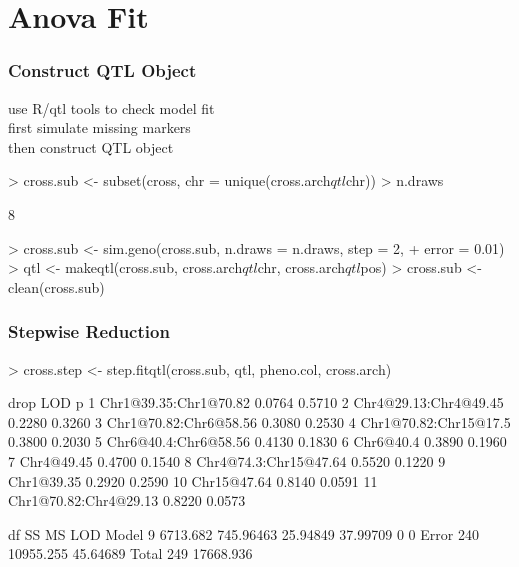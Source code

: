 \documentclass{beamer}
\begin{document}
\section{Anova Fit}

\begin{frame}[fragile]
  \frametitle{Construct QTL Object}

\tiny

use R/qtl tools to check model fit\\
first simulate missing markers\\
then construct QTL object

\begin{Schunk}
\begin{Sinput}
> cross.sub <- subset(cross, chr = unique(cross.arch$qtl$chr))
> n.draws
\end{Sinput}
\begin{Soutput}
[1] 8
\end{Soutput}
\begin{Sinput}
> cross.sub <- sim.geno(cross.sub, n.draws = n.draws, step = 2, 
+     error = 0.01)
> qtl <- makeqtl(cross.sub, cross.arch$qtl$chr, cross.arch$qtl$pos)
> cross.sub <- clean(cross.sub)
\end{Sinput}
\end{Schunk}
\end{frame}

\begin{frame}[fragile]
  \frametitle{Stepwise Reduction}

\tiny

\begin{Schunk}
\begin{Sinput}
> cross.step <- step.fitqtl(cross.sub, qtl, pheno.col, cross.arch)
\end{Sinput}
\begin{Soutput}
   drop                  LOD    p     
1  Chr1@39.35:Chr1@70.82 0.0764 0.5710
2  Chr4@29.13:Chr4@49.45 0.2280 0.3260
3  Chr1@70.82:Chr6@58.56 0.3080 0.2530
4  Chr1@70.82:Chr15@17.5 0.3800 0.2030
5  Chr6@40.4:Chr6@58.56  0.4130 0.1830
6  Chr6@40.4             0.3890 0.1960
7  Chr4@49.45            0.4700 0.1540
8  Chr4@74.3:Chr15@47.64 0.5520 0.1220
9  Chr1@39.35            0.2920 0.2590
10 Chr15@47.64           0.8140 0.0591
11 Chr1@70.82:Chr4@29.13 0.8220 0.0573
\end{Soutput}
\end{Schunk}
\begin{Schunk}
\end{Schunk}
\begin{Schunk}
\begin{Soutput}
       df        SS        MS      LOD     %
Model   9  6713.682 745.96463 25.94849 37.99709            0         0
Error 240 10955.255  45.64689                                         
Total 249 17668.936                                                   
\end{Soutput}
\end{Schunk}
\end{frame}
\end{document}
